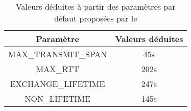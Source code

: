 \begin{table}
\begin{center}
\begin{tabular}{|c|c|}
\hline
 \rowcolor{purple!10} Paramètre & Valeurs déduites  \\ \hline \hline
 MAX\_TRANSMIT\_SPAN & 45s \\ \hline
 MAX\_RTT & 202s \\ \hline \hline
 EXCHANGE\_LIFETIME & 247s \\ \hline
 NON\_LIFETIME & 145s \\ \hline

\end{tabular}
\end{center}
\caption{Valeurs déduites à partir des paramètres par défaut proposées par le }
\label{tab-data-rate}
\end{table}



